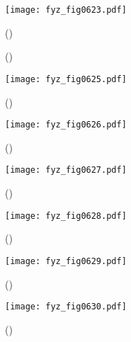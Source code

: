     \begin{figure}[ht!] %
      \centering
      \texttt{[image: fyz\_fig0623.pdf]}
      \caption{
               (\cite[s.~707]{Feynman02})}
      \label{fyz:fig0623}
    \end{figure}

    \begin{figure}[ht!]
      \centering
      \label{fyz:fig0624}
      \caption{
               (\cite[s.~748]{Feynman02})}
    \end{figure}

    \begin{figure}[ht!] %
      \centering
      \texttt{[image: fyz\_fig0625.pdf]}
      \caption{
               (\cite[s.~707]{Feynman02})}
      \label{fyz:fig0625}
    \end{figure}

    \begin{figure}[ht!] %
      \centering
      \texttt{[image: fyz\_fig0626.pdf]}
      \caption{
               (\cite[s.~707]{Feynman02})}
      \label{fyz:fig0626}
    \end{figure}

    \begin{figure}[ht!] %
      \centering
      \texttt{[image: fyz\_fig0627.pdf]}
      \caption{
               (\cite[s.~707]{Feynman02})}
      \label{fyz:fig0627}
    \end{figure}

    \begin{figure}[ht!] %
      \centering
      \texttt{[image: fyz\_fig0628.pdf]}
      \caption{
               (\cite[s.~707]{Feynman02})}
      \label{fyz:fig0628}
    \end{figure}

    \begin{figure}[ht!] %
      \centering
      \texttt{[image: fyz\_fig0629.pdf]}
      \caption{
               (\cite[s.~707]{Feynman02})}
      \label{fyz:fig0629}
    \end{figure}

    \begin{figure}[ht!] %
      \centering
      \texttt{[image: fyz\_fig0630.pdf]}
      \caption{
               (\cite[s.~707]{Feynman02})}
      \label{fyz:fig0630}
    \end{figure}


